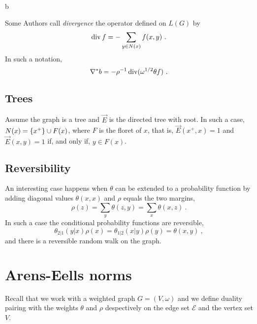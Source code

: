 b\documentclass[12pt,a4paper]{amsart}
\begin{document}
Some Authors call \emph{divergence} the operator defined on $L(G)$ by
\begin{equation*}
  \Div f = - \sum_{y \in N(x)} f(x,y) \ .
\end{equation*}
In such a notation,
\begin{equation*}
  \nabla^* b = - \rho^{-1} \operatorname*{div}(\omega^{1/2} \theta f) \ . 
\end{equation*}


\subsection*{Trees} Assume the graph is a tree and $\overrightarrow
E$ is the directed tree with root. In such a case, $N(x) = \left\{x^+\right\}
\cup F(x)$, where $F$ is the floret of $x$, that is, $\overrightarrow E(x^+,x) =
1$ and $\overrightarrow E(x,y)=1$ if, and only if, $y \in F(x)$.

\subsection*{Reversibility} An interesting case happens when $\theta$
can be extended to a probability function by adding diagonal values
$\theta(x,x)$ and $\rho$ equals the two margins,
\begin{equation*}
  \rho(z) = \sum_y \theta(z,y) = \sum_x \theta(x,z) \ .
\end{equation*}
In such a case the conditional probability functions are reversible,
\begin{equation*}
  \theta_{2|1}(y|x) \rho(x) = \theta_{1|2}(x|y) \rho(y) = \theta(x,y) \ ,
\end{equation*}
and there is a reversible random walk on the graph.


\section{Arens-Eells norms}

Recall that we work with a weighted graph $G = (V,\omega)$ and we
define duality pairing with the weights $\theta$ and $\rho$
despectively on the edge set $\mathcal E$ and the vertex set $V$.
\end{document}
